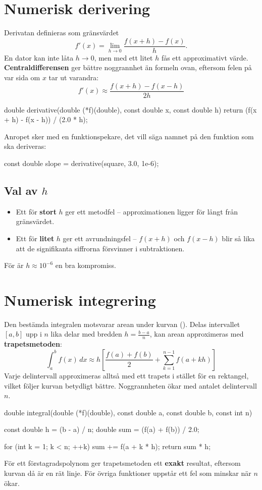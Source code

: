 \section{Numerisk derivering}
\label{c18:sec:derivering}
Derivatan definieras som gränsvärdet
\[
  f'(x) = \lim_{h \to 0} \frac{f(x + h) - f(x)}{h}.
\]
En dator kan inte låta $h \to 0$, men med ett litet $h$ fås ett approximativt värde.
\textbf{Centraldifferensen} ger bättre noggrannhet än formeln ovan, eftersom felen på var sida om
$x$ tar ut varandra:
\[
  f'(x) \approx \frac{f(x + h) - f(x - h)}{2h}
\]
\begin{ccode}
double derivative(double (*f)(double), const double x, const double h)
{
    return (f(x + h) - f(x - h)) / (2.0 * h);
}
\end{ccode}
Anropet sker med en funktionspekare, det vill säga namnet på den funktion som ska deriveras:
\begin{ccode}
const double slope = derivative(square, 3.0, 1e-6);
\end{ccode}

\subsection{Val av \texorpdfstring{$h$}{h}}
\label{c18:sec:valh}
\begin{itemize}
  \item Ett för \textbf{stort} $h$ ger ett metodfel -- approximationen ligger för långt från
    gränsvärdet.
  \item Ett för \textbf{litet} $h$ ger ett avrundningsfel -- $f(x + h)$ och $f(x - h)$ blir så
    lika att de signifikanta siffrorna försvinner i subtraktionen.
\end{itemize}
För  är $h \approx 10^{-6}$ en bra kompromiss.

\section{Numerisk integrering}
\label{c18:sec:integrering}
Den bestämda integralen motsvarar arean under kurvan (). Delas intervallet $[a, b]$
upp i $n$ lika delar med bredden $h = \frac{b - a}{n}$, kan arean approximeras med
\textbf{trapetsmetoden}:
\[
  \int_a^b f(x)\,dx \approx h\left[\frac{f(a) + f(b)}{2} + \sum_{k=1}^{n-1} f(a + kh)\right]
\]
Varje delintervall approximeras alltså med ett trapets i stället för en rektangel, vilket följer
kurvan betydligt bättre. Noggrannheten ökar med antalet delintervall $n$.
\begin{ccode}
double integral(double (*f)(double), const double a, const double b, const int n)
{
    const double h = (b - a) / n;
    double sum     = (f(a) + f(b)) / 2.0;

    for (int k = 1; k < n; ++k)
    {
        sum += f(a + k * h);
    }
    return sum * h;
}
\end{ccode}
För ett förstagradspolynom ger trapetsmetoden ett \textbf{exakt} resultat, eftersom kurvan då är
en rät linje. För övriga funktioner uppstår ett fel som minskar när $n$ ökar.

